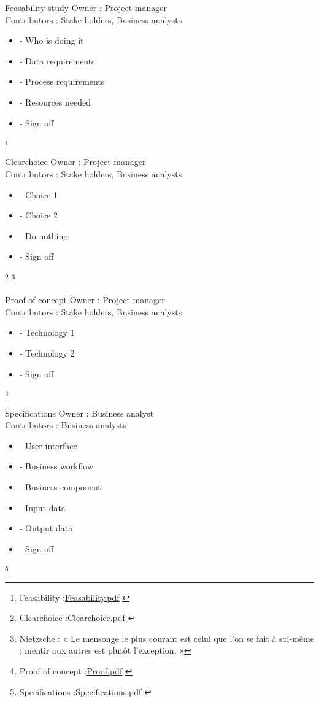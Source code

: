 \documentclass[8pt]{beamer}
\begin{document}
\begin{frame}{Feasability study}
Owner : Project manager\\
Contributors : Stake holders, Business analysts\\
 \begin{itemize}
  \item
- Who is doing it 
  \item
- Data requirements 
  \item
- Process requirements 
  \item
- Resources needed 
  \item
- Sign off 
 \end{itemize}
\footnote{
\footnotesize{
\tiny{Feasability :\url{Feasability.pdf} }}
}
\end{frame}

\begin{frame}{Clearchoice}
Owner : Project manager\\
Contributors : Stake holders, Business analysts\\
 \begin{itemize}
  \item
- Choice 1
  \item
- Choice 2
  \item
- Do nothing
  \item
- Sign off 
 \end{itemize}
\footnote{
\footnotesize{
\tiny{Clearchoice :\url{Clearchoice.pdf} }}
}
\footnote{
\tiny{Nietzsche : « Le mensonge le plus courant est celui que l'on se fait à soi-même ; mentir aux autres est plutôt l'exception. »}
}
\end{frame}

\begin{frame}{Proof of concept}
Owner : Project manager\\
Contributors : Stake holders, Business analysts\\
 \begin{itemize}
  \item
- Technology 1
  \item
- Technology 2
  \item
- Sign off 
 \end{itemize}
\footnote{
\footnotesize{
\tiny{Proof of concept :\url{Proof.pdf} }}
}
\end{frame}

\begin{frame}{Specifications}
Owner : Business analyst\\
Contributors : Business analysts\\
 \begin{itemize}
  \item
- User interface
  \item
- Business workflow
  \item
- Business component
  \item
- Input data
  \item
- Output data
  \item
- Sign off 
 \end{itemize}
\footnote{
\footnotesize{
\tiny{Specifications :\url{Specifications.pdf} }}
}
\end{frame}
\end{document}
